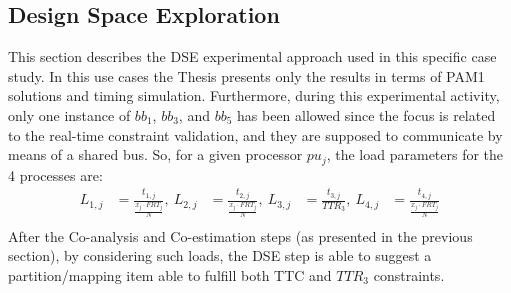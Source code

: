 \subsection{Design Space Exploration}
%
This section describes the DSE experimental approach used in this specific case study. In this use cases the Thesis presents only the results in terms of PAM1 solutions and timing simulation. Furthermore, during this experimental activity, only one instance of $bb_1$, $bb_3$, and $bb_5$ has been allowed since the focus is related to the real-time constraint validation, and they are supposed to communicate by means of a shared bus. So, for a given processor $pu_j$, the load parameters for the 4 processes are:
%
\begin{equation} \label{equation131_PAM2}
  \begin{aligned}
    L_{1,j} &= \frac{t_{1,j}}{\frac{x_j \cdot FRT_j}{N}}, \ 
    L_{2,j} &= \frac{t_{2,j}}{\frac{x_j \cdot FRT_j}{N}}, \
    L_{3,j} &= \frac{t_{3,j}}{TTR_3}, \   
    L_{4,j} &= \frac{t_{4,j}}{\frac{x_j \cdot FRT_j}{N}} \\
\end{aligned}
\end{equation}
%
After the Co-analysis and Co-estimation steps (as presented in the previous section), by considering such loads, the DSE step is able to suggest a partition/mapping item able to fulfill both TTC and $TTR_3$ constraints. \par
%
